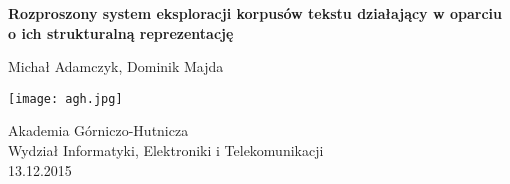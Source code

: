 \begin{titlepage}
    \begin{center}        
        \Large
        \textbf{Rozproszony system eksploracji korpusów tekstu działający w oparciu o ich strukturalną reprezentację}
             
        \vspace{1cm}
        
        Michał Adamczyk, Dominik Majda
        
        \vfill
       
        \vspace{0.7cm}
        
        \texttt{[image: agh.jpg]}
        
		Akademia Górniczo-Hutnicza\\        
        Wydział Informatyki, Elektroniki i Telekomunikacji\\ 
        13.12.2015
        
    \end{center}
\end{titlepage}